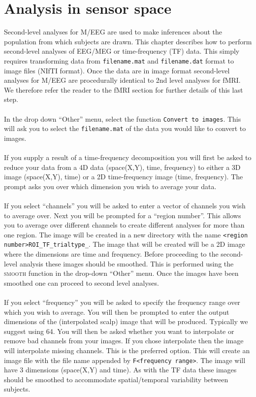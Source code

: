 \chapter{Analysis in sensor space \label{Chap:eeg:sensoranalysis}}

Second-level analyses for M/EEG are used to make inferences about the population from which subjects are drawn. This chapter describes how to perform second-level analyses of EEG/MEG or time-frequency (TF) data. This simply requires transforming data from \texttt{filename.mat} and \texttt{filename.dat}
format to image files (NIfTI format). Once the data are in image format second-level analyses for M/EEG are procedurally identical to 2nd level analyses for fMRI.
We therefore refer the reader to the fMRI section for further details of this last step.
\\
\\
In the drop down ``Other'' menu, select the function \texttt{Convert to images}. This will ask you to select the \texttt{filename.mat} of the data you would like to convert to images.
\\
\\
If you supply a result of a time-frequency decomposition you will first be asked to reduce your data from a 4D data (space(X,Y), time, frequency) to either a 3D image (space(X,Y), time) or a 2D time-frequency image (time, frequency). The prompt asks you over which dimension you wish to average your data.
\\
\\
If you select ``channels'' you will be asked to enter a vector of channels you wish to average over. Next you will be prompted for a ``region number''. This allows you to average over different channels to create different analyses for more than one region. The image will be created in a new directory with the name \texttt{<region number>ROI\_TF\_trialtype\_<condition number>}. The image that will be created will be a 2D image where the dimensions are time and frequency. Before proceeding to the second-level analysis these images should be smoothed. This is performed using the \textsc{smooth} function in the drop-down ``Other'' menu. Once the images have been smoothed one can proceed to second level analyses.
\\
\\
If you select ``frequency'' you will be asked to specify the frequency range over which you wish to average. You will then be prompted to enter the output dimensions of the (interpolated scalp) image that will be produced. Typically we suggest using 64. You will then be asked whether you want to interpolate or remove bad channels from your images. If you chose interpolate then the image will interpolate missing channels. This is the preferred option. This will create an image file with the file name appended by \texttt{F<frequency range>}. The image will have 3 dimensions (space(X,Y) and time). As with the TF data these images should be smoothed to accommodate spatial/temporal variability between subjects.
